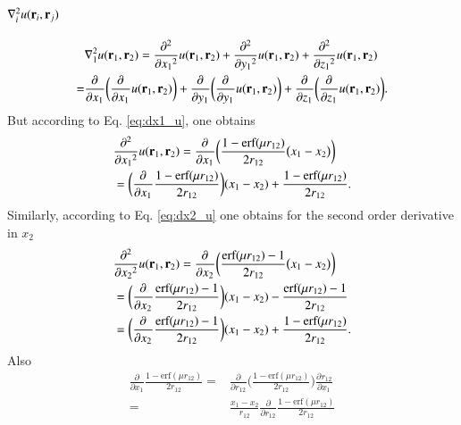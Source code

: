 \documentclass[aip,jcp,reprint,noshowkeys,superscriptaddress]{revtex4-1}
\newcommand{\deriv}[3]{\frac{\partial^{#3} #1}{\partial {#2}^{#3}}}
\newcommand{\br}[0]{{\bf {r}}}
\begin{document}
\subsection{$\nabla^2_i u(\br{}_i,\br{}_j)$}
\begin{equation}
 \begin{aligned}
 &\nabla^2_1 u(\br{}_1,\br{}_2) =  \deriv{}{x_{1}}{2}  u(\br{}_1,\br{}_2) + \deriv{}{y_{1}}{2}  u(\br{}_1,\br{}_2) + \deriv{}{z_{1}}{2}  u(\br{}_1,\br{}_2) \\
                                 = & \deriv{}{x_{1}}{}\bigg( \deriv{}{x_{1}}{}u(\br{}_1,\br{}_2) \bigg)  + 
                                   \deriv{}{y_{1}}{}\bigg( \deriv{}{y_{1}}{}u(\br{}_1,\br{}_2) \bigg)  + 
                                   \deriv{}{z_{1}}{}\bigg( \deriv{}{z_{1}}{}u(\br{}_1,\br{}_2) \bigg). 
 \end{aligned}
\end{equation}
But according to Eq. \eqref{eq:dx1_u}, one obtains 
\begin{equation}
 \begin{aligned}
 \label{eq:d2_x1_0}
& \deriv{}{x_{1}}{2}  u(\br{}_1,\br{}_2) = \deriv{}{x_{1}}{}\bigg(\frac{1 - \text{erf}(\mu r_{12})}{2 r_{12}} \big(x_1 - x_2 \big) \bigg) \\
& = \bigg( \deriv{}{x_1}{} \frac{1 - \text{erf}(\mu r_{12})}{2 r_{12}}\bigg) (x_1 - x_2 ) +  \frac{1 - \text{erf}(\mu r_{12})}{2 r_{12}}.
 \end{aligned}
\end{equation}
Similarly, according to Eq. \eqref{eq:dx2_u} one obtains for the second order derivative in $x_2$
\begin{equation}
 \begin{aligned}
 \label{eq:d2_x2_0}
& \deriv{}{x_{2}}{2}  u(\br{}_1,\br{}_2) = \deriv{}{x_{2}}{}\bigg(\frac{\text{erf}(\mu r_{12}) - 1}{2 r_{12}} \big(x_1 - x_2 \big) \bigg) \\
& = \bigg( \deriv{}{x_2}{} \frac{\text{erf}(\mu r_{12}) -1 }{2 r_{12}}\bigg) (x_1 - x_2 ) -  \frac{\text{erf}(\mu r_{12}) -1}{2 r_{12}} \\
& = \bigg( \deriv{}{x_2}{} \frac{\text{erf}(\mu r_{12}) -1 }{2 r_{12}}\bigg) (x_1 - x_2 ) +  \frac{ 1 - \text{erf}(\mu r_{12})}{2 r_{12}}. 
 \end{aligned}
\end{equation}
Also
\begin{equation}
 \label{eq:d2_x1_1}
 \begin{aligned}
 \deriv{}{x_1}{} \frac{1 - \text{erf}(\mu r_{12})}{2 r_{12}} = & \deriv{}{r_{12}}{}\bigg( \frac{1 - \text{erf}(\mu r_{12})}{2 r_{12}}\bigg) \deriv{r_{12}}{x_1}{} \\
      = & \frac{x_1 - x_2}{r_{12}} \deriv{}{r_{12}}{} \frac{1 - \text{erf}(\mu r_{12})}{2 r_{12}} 
 \end{aligned}
\end{equation}
\end{document}
